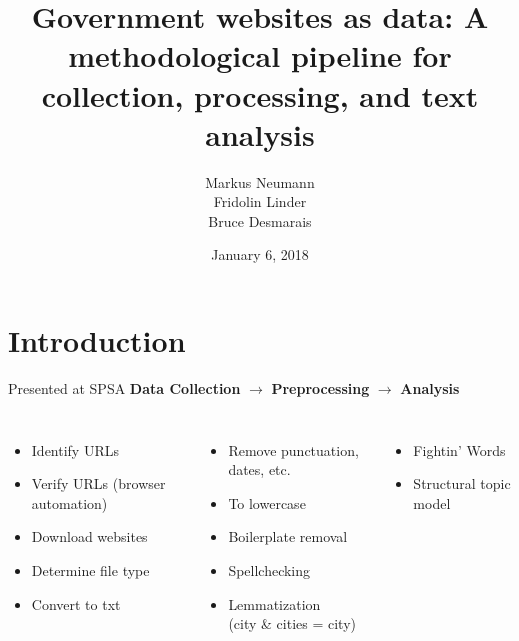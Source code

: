\documentclass[12pt]{beamer}
\title[]{Government websites as data: A methodological pipeline for
collection, processing, and text analysis}
\author{Markus Neumann \\ Fridolin Linder \\ Bruce Desmarais}
\institute{The Pennsylvania State University}
\date{January 6, 2018}
\begin{document}
\section{Introduction}
\begin{frame}
\titlepage
\end{frame}

\begin{frame}{Presented at SPSA}
	\textbf{Data Collection} \hspace{2mm} $\rightarrow$ \hspace{2mm} \textbf{Preprocessing} \hspace{2mm} $\rightarrow$ \hspace{2mm} \textbf{Analysis}
\begin{columns}
	\vspace{5mm}
	\begin{itemize}
		\item Identify URLs
		\item Verify URLs (browser automation)
		\item Download websites
		\item Determine file type
		\item Convert to txt
	\end{itemize}		
	\vspace{5mm}
	\begin{itemize}
		\item Remove punctuation, dates, etc.
		\item To lowercase
		\item Boilerplate removal
		\item Spellchecking
		\item Lemmatization \\ (city \& cities = city)
	\end{itemize}
	\vspace{5mm}
	\begin{itemize}
		\item Fightin' Words
		\item Structural topic model
	\end{itemize}
\end{columns}
\end{frame}
\end{document}
